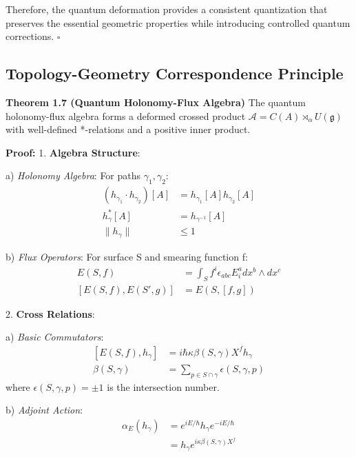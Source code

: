 \documentclass[12pt,a4paper]{article}
\begin{document}
Therefore, the quantum deformation provides a consistent quantization that preserves the essential geometric properties while introducing controlled quantum corrections. $\square$

\subsection{Topology-Geometry Correspondence Principle}

\textbf{Theorem 1.7 (Quantum Holonomy-Flux Algebra)}
The quantum holonomy-flux algebra forms a deformed crossed product $\mathcal{A} = C(A) \rtimes_\alpha U(\mathfrak{g})$ with well-defined *-relations and a positive inner product.

\textbf{Proof:}
1. \textbf{Algebra Structure}:
   
   a) \textit{Holonomy Algebra}:
      For paths $\gamma_1, \gamma_2$:
      \[
      \begin{aligned}
      (h_{\gamma_1} \cdot h_{\gamma_2})[A] &= h_{\gamma_1}[A]h_{\gamma_2}[A] \\
      h_{\gamma}^*[A] &= h_{\gamma^{-1}}[A] \\
      \|h_{\gamma}\| &\leq 1
      \end{aligned}
      \]
   
   b) \textit{Flux Operators}:
      For surface S and smearing function f:
      \[
      \begin{aligned}
      E(S,f) &= \int_S f^i\epsilon_{abc}E^a_idx^b\wedge dx^c \\
      [E(S,f), E(S',g)] &= E(S,[f,g])
      \end{aligned}
      \]

2. \textbf{Cross Relations}:
   
   a) \textit{Basic Commutators}:
      \[
      \begin{aligned}
      [E(S,f), h_\gamma] &= i\hbar\kappa\beta(S,\gamma)X^f h_\gamma \\
      \beta(S,\gamma) &= \sum_{p \in S \cap \gamma} \epsilon(S,\gamma,p)
      \end{aligned}
      \]
      where $\epsilon(S,\gamma,p) = \pm1$ is the intersection number.
   
   b) \textit{Adjoint Action}:
      \[
      \begin{aligned}
      \alpha_E(h_\gamma) &= e^{iE/\hbar}h_\gamma e^{-iE/\hbar} \\
      &= h_\gamma e^{i\kappa\beta(S,\gamma)X^f}
      \end{aligned}
      \]
\end{document}
